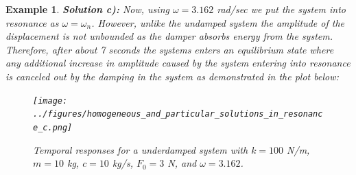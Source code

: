\documentclass[12pt,letter]{article}
\newtheorem{ex}{Example}
\numberwithin{ex}{section} %
\newenvironment{example}{\begin{mdframed}[middlelinewidth=0.5mm]\begin{ex}\normalfont}{\end{ex}\end{mdframed}}
\numberwithin{re}{section} %
\begin{document}
\begin{example}
				\noindent\textbf{Solution c):} Now, using $\omega=3.162$ rad/sec we put the system into resonance as $\omega=\omega_n$. However, unlike the undamped system  the amplitude of the displacement is not unbounded as the damper absorbs energy from the system. Therefore, after about 7 seconds the systems enters an equilibrium state where any additional increase in amplitude caused by the system entering into resonance is canceled out by the damping in the system as demonstrated in the plot below:
				\begin{figure}[H]
					\centering
					\texttt{[image: ../figures/homogeneous\_and\_particular\_solutions\_in\_resonance\_c.png]}
					\caption{Temporal responses for a underdamped system with $k=100$ N/m, $m=10$ kg,  $c=10$ kg/s, $F_0=3$ N, and $\omega = 3.162$.}
				\end{figure}				
			\end{example}	
\end{document}
